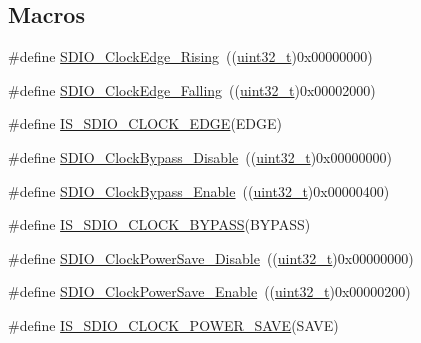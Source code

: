 \subsection*{Macros}
\begin{DoxyCompactItemize}
\item 
\#define \hyperlink{group___s_d_i_o___clock___edge_ga6d0f902037762a3048d95303c0037313}{S\+D\+I\+O\+\_\+\+Clock\+Edge\+\_\+\+Rising}~((\hyperlink{_p_e___types_8h_a33594304e786b158f3fb30289278f5af}{uint32\+\_\+t})0x00000000)
\item 
\#define \hyperlink{group___s_d_i_o___clock___edge_ga7be68024e3e2fe1994def85bc944189b}{S\+D\+I\+O\+\_\+\+Clock\+Edge\+\_\+\+Falling}~((\hyperlink{_p_e___types_8h_a33594304e786b158f3fb30289278f5af}{uint32\+\_\+t})0x00002000)
\item 
\#define \hyperlink{group___s_d_i_o___clock___edge_ga63420b10a52e3d82a89a45f20dc41786}{I\+S\+\_\+\+S\+D\+I\+O\+\_\+\+C\+L\+O\+C\+K\+\_\+\+E\+D\+GE}(E\+D\+GE)
\item 
\#define \hyperlink{group___s_d_i_o___clock___bypass_gacc168d55136a0c6575e5afd7a6550343}{S\+D\+I\+O\+\_\+\+Clock\+Bypass\+\_\+\+Disable}~((\hyperlink{_p_e___types_8h_a33594304e786b158f3fb30289278f5af}{uint32\+\_\+t})0x00000000)
\item 
\#define \hyperlink{group___s_d_i_o___clock___bypass_ga5e1e9f7e05ea62dd2315eb556bc10e5c}{S\+D\+I\+O\+\_\+\+Clock\+Bypass\+\_\+\+Enable}~((\hyperlink{_p_e___types_8h_a33594304e786b158f3fb30289278f5af}{uint32\+\_\+t})0x00000400)
\item 
\#define \hyperlink{group___s_d_i_o___clock___bypass_ga5d5a2fcdd3150e4a89c5aa1efd738dec}{I\+S\+\_\+\+S\+D\+I\+O\+\_\+\+C\+L\+O\+C\+K\+\_\+\+B\+Y\+P\+A\+SS}(B\+Y\+P\+A\+SS)
\item 
\#define \hyperlink{group___s_d_i_o___clock___power___save_ga032aa5fb2dfd7ba5dbd60a3845c82ba0}{S\+D\+I\+O\+\_\+\+Clock\+Power\+Save\+\_\+\+Disable}~((\hyperlink{_p_e___types_8h_a33594304e786b158f3fb30289278f5af}{uint32\+\_\+t})0x00000000)
\item 
\#define \hyperlink{group___s_d_i_o___clock___power___save_ga9f5b66a0044c4ff36a3eb1ec758f7ea7}{S\+D\+I\+O\+\_\+\+Clock\+Power\+Save\+\_\+\+Enable}~((\hyperlink{_p_e___types_8h_a33594304e786b158f3fb30289278f5af}{uint32\+\_\+t})0x00000200)
\item 
\#define \hyperlink{group___s_d_i_o___clock___power___save_ga41988203e5d4e35a755aa604f1876cd3}{I\+S\+\_\+\+S\+D\+I\+O\+\_\+\+C\+L\+O\+C\+K\+\_\+\+P\+O\+W\+E\+R\+\_\+\+S\+A\+VE}(S\+A\+VE)
\item 

\end{DoxyCompactItemize}
